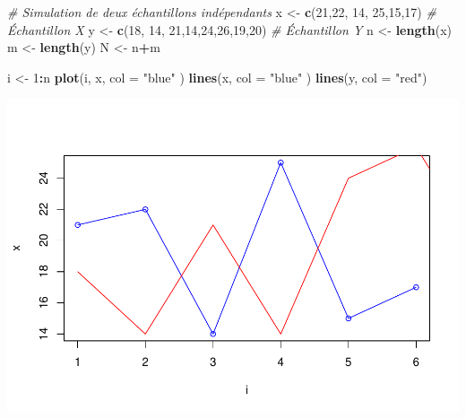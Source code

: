 \documentclass[
  12pt,
]{article}
\newenvironment{Shaded}{\begin{snugshade}}{\end{snugshade}}
\newcommand{\AttributeTok}[1]{\textcolor[rgb]{0.13,0.29,0.53}{#1}}
\newcommand{\CommentTok}[1]{\textcolor[rgb]{0.56,0.35,0.01}{\textit{#1}}}
\newcommand{\DecValTok}[1]{\textcolor[rgb]{0.00,0.00,0.81}{#1}}
\newcommand{\FunctionTok}[1]{\textcolor[rgb]{0.13,0.29,0.53}{\textbf{#1}}}
\newcommand{\NormalTok}[1]{#1}
\newcommand{\OtherTok}[1]{\textcolor[rgb]{0.56,0.35,0.01}{#1}}
\newcommand{\SpecialCharTok}[1]{\textcolor[rgb]{0.81,0.36,0.00}{\textbf{#1}}}
\newcommand{\StringTok}[1]{\textcolor[rgb]{0.31,0.60,0.02}{#1}}
\begin{document}
\begin{Shaded}
\begin{Highlighting}[]
\CommentTok{\# Simulation de deux échantillons indépendants}
\NormalTok{x }\OtherTok{\textless{}{-}} \FunctionTok{c}\NormalTok{(}\DecValTok{21}\NormalTok{,}\DecValTok{22}\NormalTok{, }\DecValTok{14}\NormalTok{, }\DecValTok{25}\NormalTok{,}\DecValTok{15}\NormalTok{,}\DecValTok{17}\NormalTok{)   }\CommentTok{\# Échantillon X}
\NormalTok{y }\OtherTok{\textless{}{-}} \FunctionTok{c}\NormalTok{(}\DecValTok{18}\NormalTok{, }\DecValTok{14}\NormalTok{, }\DecValTok{21}\NormalTok{,}\DecValTok{14}\NormalTok{,}\DecValTok{24}\NormalTok{,}\DecValTok{26}\NormalTok{,}\DecValTok{19}\NormalTok{,}\DecValTok{20}\NormalTok{)   }\CommentTok{\# Échantillon Y}
\NormalTok{n }\OtherTok{\textless{}{-}} \FunctionTok{length}\NormalTok{(x)}
\NormalTok{m }\OtherTok{\textless{}{-}} \FunctionTok{length}\NormalTok{(y)}
\NormalTok{N }\OtherTok{\textless{}{-}}\NormalTok{ n}\SpecialCharTok{+}\NormalTok{m}
\end{Highlighting}
\end{Shaded}

\begin{Shaded}
\begin{Highlighting}[]
\NormalTok{i }\OtherTok{\textless{}{-}} \DecValTok{1}\SpecialCharTok{:}\NormalTok{n}
\FunctionTok{plot}\NormalTok{(i, x, }\AttributeTok{col =} \StringTok{"blue"}\NormalTok{ )}
\FunctionTok{lines}\NormalTok{(x, }\AttributeTok{col =} \StringTok{"blue"}\NormalTok{ )}
\FunctionTok{lines}\NormalTok{(y, }\AttributeTok{col =} \StringTok{"red"}\NormalTok{)}
\end{Highlighting}
\end{Shaded}

\includegraphics{Stat_non_para_files/figure-latex/unnamed-chunk-71-1.pdf}
\end{document}

